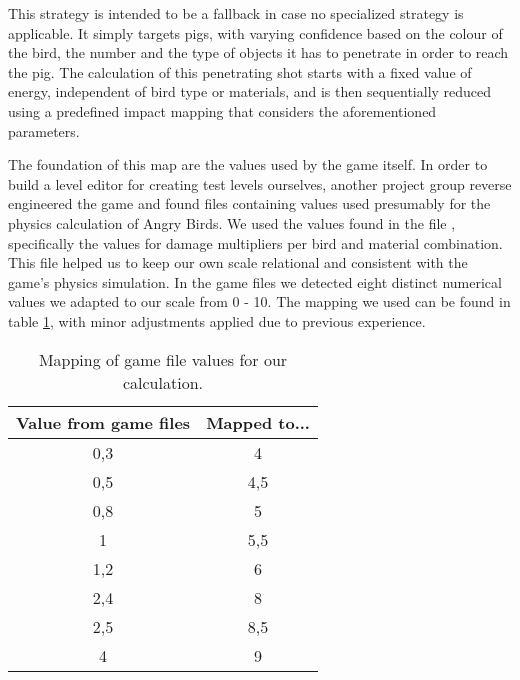 This strategy is intended to be a fallback in case no specialized strategy is applicable. It simply targets pigs, with varying confidence based on the colour of the bird, the number and the type of objects it has to penetrate in order to reach the pig. The calculation of this penetrating shot starts with a fixed value of energy, independent of bird type or materials, and is then sequentially reduced using a predefined impact mapping that considers the aforementioned parameters.

The foundation of this map are the values used by the game itself. In order to build a level editor for creating test levels ourselves, another project group reverse engineered the game and found files containing values used presumably for the physics calculation of Angry Birds. We used the values found in the file , specifically the values for damage multipliers per bird and material combination. This file helped us to keep our own scale relational and consistent with the game's physics simulation. In the game files we detected eight distinct numerical values we adapted to our scale from 0 - 10. The mapping we used can be found in table \ref{tab:mapping}, with minor adjustments applied due to previous experience.\\

 \begin{table}[h]
 	\begin{center}
 		\begin{tabular}{c | c}
 			Value from game files & Mapped to... \\
 			\hline
 			0,3 & 4 \\
 			0,5 & 4,5 \\
 			0,8 & 5 \\
 			1   & 5,5 \\
 			1,2 & 6 \\
 			2,4 & 8 \\
 			2,5 & 8,5 \\
 			4   & 9 \\
 		\end{tabular}
 	\end{center}
 	\caption{Mapping of game file values for our calculation.\label{tab:mapping}}
 \end{table}